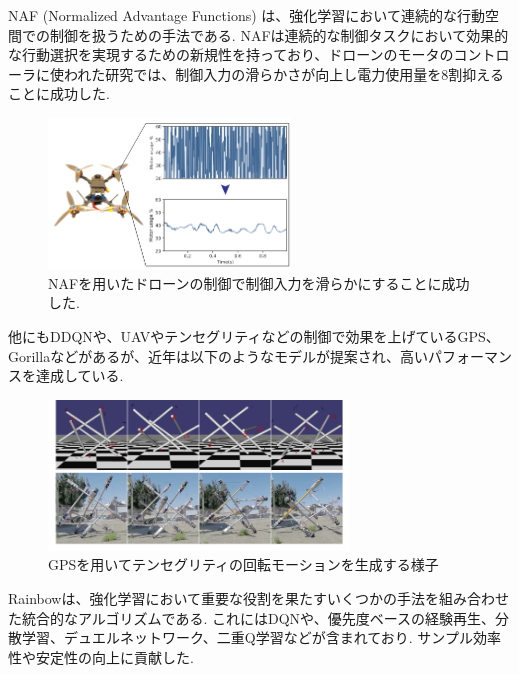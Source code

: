 \documentclass[a4j, twocolumn, 10pt,pdflatex,ja=standard]{bxjsarticle}
\begin{document}
NAF (Normalized Advantage Functions) \cite{naf} は、強化学習において連続的な行動空間での制御を扱うための手法である. NAFは連続的な制御タスクにおいて効果的な行動選択を実現するための新規性を持っており、ドローンのモータのコントローラに使われた研究では、制御入力の滑らかさが向上し電力使用量を8割抑えることに成功した\cite{NAFdrone}. 

\begin{figure}[htbp]
 \begin{center}
 \includegraphics[height=4cm]{./figure/nafdrone.png}
 \caption{NAFを用いたドローンの制御で制御入力を滑らかにすることに成功した.}
 \label{fig:mri}
 \end{center}
\end{figure}
\vspace{-9mm}


他にもDDQN\cite{ddqn}や、UAVやテンセグリティなどの制御で効果を上げているGPS\cite{gps}、Gorilla\cite{gorilla}などがあるが、近年は以下のようなモデルが提案され、高いパフォーマンスを達成している.
\begin{figure}[htbp]
  \begin{center}
  \includegraphics[height=4cm]{./figure/tensegriti.png}
  \caption{GPSを用いてテンセグリティの回転モーションを生成する様子\cite{gps}}
  \label{fig:mri}
  \end{center}
\end{figure}
\vspace{-9mm}

Rainbow\cite{rainbow}は、強化学習において重要な役割を果たすいくつかの手法を組み合わせた統合的なアルゴリズムである. これにはDQNや、優先度ベースの経験再生、分散学習、デュエルネットワーク、二重Q学習などが含まれており. サンプル効率性や安定性の向上に貢献した. 
\end{document}
